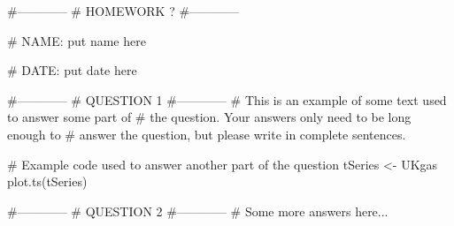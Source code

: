 \begin{Schunk}
\begin{Sinput}
 #------------
 # HOMEWORK ? 
 #------------
 
 # NAME: {put name here}
 
 # DATE: {put date here}
 
 #------------
 # QUESTION 1
 #------------
 # This is an example of some text used to answer some part of
 # the question.  Your answers only need to be long enough to
 # answer the question, but please write in complete sentences.
 
 # Example code used to answer another part of the question
 tSeries <- UKgas
 plot.ts(tSeries)
 
 #------------
 # QUESTION 2
 #------------
 # Some more answers here...
\end{Sinput}
\end{Schunk}
